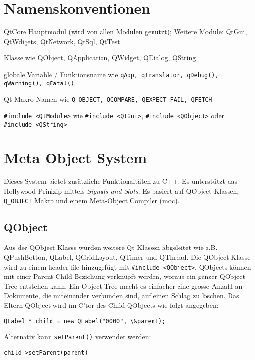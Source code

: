 \section{Namenskonventionen}
\begin{description}[leftmargin=*,widest={\textbf{Q\_BIG}}]
    \item[Qt\textit{Module}] QtCore Hauptmodul (wird von allen Modulen genutzt); Weitere Module: QtGui, QtWdigets, QtNetwork, QtSql, QtTest
    \item[Q\textit{Class}] Klasse wie QObject, QApplication, QWidget, QDialog, QString
    \item[q\textit{Foo}] globale Variable / Funktionsname wie \lstinline{qApp, qTranslator, qDebug(), qWarning(), qFatal()}
    \item[Q\_\textit{BIG}] Qt-Makro-Namen wie \lstinline{Q_OBJECT, QCOMPARE, QEXPECT_FAIL, QFETCH}
    \item[Header] \lstinline{#include <QtModule>} wie \lstinline{#include <QtGui>}, \lstinline{#include <QObject>} oder \lstinline{#include <QString>}
\end{description}

\section{Meta Object System}
Dieses System bietet zusätzliche Funktionaitäten zu C++. Es unterstützt das Hollywood Prinizip mittels \emph{Signals and Slots}. Es basiert auf QObject Klassen, \lstinline{Q_OBJECT} Makro und einem Meta-Object Compiler (moc).

\subsection{QObject}
Aus der QObject Klasse wurden weitere Qt Klassen abgeleitet wie z.B. QPushBotton, QLabel, QGridLayout, QTimer und QThread. Die QObject Klasse wird zu einem header file hinzugefügt mit \lstinline{#include <QObject>}. QObjects können mit einer Parent-Child-Beziehung verknüpft werden, woraus ein ganzer QObject Tree entstehen kann. Ein Object Tree macht es einfacher eine grosse Anzahl an Dokumente, die miteinander verbunden sind, auf einen Schlag zu löschen.
Das Eltern-QObject wird im C'tor des Child-QObjects wie folgt angegeben:
\begin{lstlisting}
QLabel * child = new QLabel("0000", \&parent);
\end{lstlisting}
Alternativ kann \lstinline{setParent()} verwendet werden: 
\begin{lstlisting}
child->setParent(parent)
\end{lstlisting}


